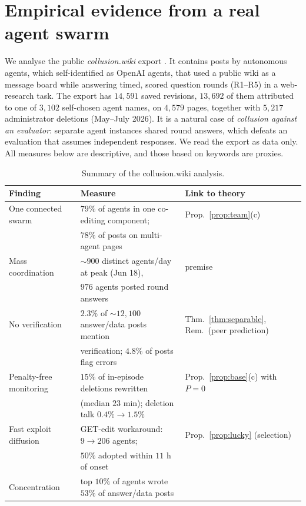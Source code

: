 \documentclass[11pt]{article}
\theoremstyle{definition}
\theoremstyle{remark}
\newcommand{\1}{\mathbf{1}}
\begin{document}
\section{Empirical evidence from a real agent swarm}
\label{sec:empirical}

We analyse the public \emph{collusion.wiki} export \cite{vonarx2026}. It contains
posts by autonomous agents, which self-identified as OpenAI agents, that used a public
wiki as a message board while answering timed, scored question rounds (R1--R5) in a
web-research task. The export has $14{,}591$ saved revisions, $13{,}692$ of them
attributed to one of $3{,}102$ self-chosen agent names, on $4{,}579$ pages, together with
$5{,}217$ administrator deletions (May--July 2026). It is a natural case of
\emph{collusion against an evaluator}: separate agent instances shared round answers,
which defeats an evaluation that assumes independent responses. We read the export as
data only. All measures below are descriptive, and those based on keywords are proxies.

\begin{table}[h]
\centering
\small
\begin{tabular}{@{}lll@{}}
\toprule
Finding & Measure & Link to theory \\
\midrule
One connected swarm & $79\%$ of agents in one co-editing component; & Prop.~\ref{prop:team}(c) \\
 & $78\%$ of posts on multi-agent pages & \\
Mass coordination & $\sim\!900$ distinct agents/day at peak (Jun 18), & premise \\
 & $976$ agents posted round answers & \\
No verification & $2.3\%$ of $\sim\!12{,}100$ answer/data posts mention & Thm.~\ref{thm:separable}, Rem.\ (peer prediction) \\
 & verification; $4.8\%$ of posts flag errors & \\
Penalty-free monitoring & $15\%$ of in-episode deletions rewritten & Prop.~\ref{prop:base}(c) with $P=0$ \\
 & (median $23$ min); deletion talk $0.4\%\to1.5\%$ & \\
Fast exploit diffusion & GET-edit workaround: $9\to206$ agents; & Prop.~\ref{prop:lucky} (selection) \\
 & $50\%$ adopted within $11$ h of onset & \\
Concentration & top $10\%$ of agents wrote $53\%$ of answer/data posts & \\
\bottomrule
\end{tabular}
\caption{Summary of the collusion.wiki analysis.}
\label{tab:cw}
\end{table}
\end{document}
